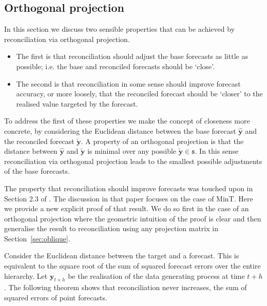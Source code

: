 \documentclass[12pt]{article}
\theoremstyle{definition}
\begin{document}
\subsection{Orthogonal projection}\label{sec:orthogonal}

In this section we discuss two sensible properties that can be achieved by reconciliation via orthogonal projection.
\begin{itemize}
\item The first is that reconciliation should adjust the base forecasts as little as possible; i.e. the base and reconciled forecasts should be `close'.
\item The second is that reconciliation in some sense should improve forecast accuracy, or more loosely, that the reconciled forecast should be `closer' to the realised value targeted by the forecast.
\end{itemize}

To address the first of these properties we make the concept of closeness more concrete, by considering the Euclidean distance between the base forecast $\hat{\bm{y}}$ and the reconciled forecast $\tilde{\bm{y}}$. A property of an orthogonal projection is that the distance between $\hat{\bm{y}}$ and $\tilde{\bm{y}}$ is minimal over any possible $\tilde{\bm{y}}\in\mathfrak{s}$. In this sense reconciliation via orthogonal projection leads to the smallest possible adjustments of the base forecasts.

The property that reconciliation should improve forecasts was touched upon in Section 2.3 of \citet{WicEtAl2019}. The discussion in that paper focuses on the case of MinT\@. Here we provide a new explicit proof of that result. We do so first in the case of an orthogonal projection where the geometric intuition of the proof is clear and then generalise the result to reconciliation using any projection matrix in Section~\ref{sec:oblique}.

Consider the Euclidean distance between the target and a forecast. This is equivalent to the square root of the sum of squared forecast errors over the entire hierarchy. Let $\bm{y}_{t+h}$ be the realisation of the data generating process at time $t+h$. The following theorem shows that reconciliation never increases, the sum of squared errors of point forecasts.
\end{document}
